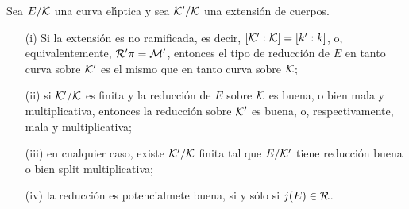 \begin{propoReduccionBuenaYMala}\label{propo:reduccionbuenaymala}
	Sea $E/\cal{K}$ una curva el\'{\i}ptica y sea $\cal{K}'/\cal{K}$ una
	extensi\'{o}n de cuerpos.
	\begin{itemize}
		\item[(i)] Si la extensi\'{o}n es no ramificada, es decir,
			$[\cal{K}':\cal{K}]=[k':k]$, o, equivalentemente,
			$\cal{R}'\pi=\cal{M}'$, entonces el tipo de
			reducci\'{o}n de $E$ en tanto curva sobre $\cal{K}'$ es
			el mismo que en tanto curva sobre $\cal{K}$;
		\item[(ii)] si $\cal{K}'/\cal{K}$ es finita y la reducci\'{o}n
			de $E$ sobre $\cal{K}$ es buena, o bien mala y
			multiplicativa, entonces la reducci\'{o}n sobre
			$\cal{K}'$ es buena, o, respectivamente, mala y
			multiplicativa;
		\item[(iii)] en cualquier caso, existe $\cal{K}'/\cal{K}$
			finita tal que $E/\cal{K}'$ tiene reducci\'{o}n buena o
			bien split multiplicativa;
		\item[(iv)] la reducci\'{o}n es potencialmete buena, si y
			s\'{o}lo si $j(E)\in\cal{R}$.
	\end{itemize}
\end{propoReduccionBuenaYMala}

